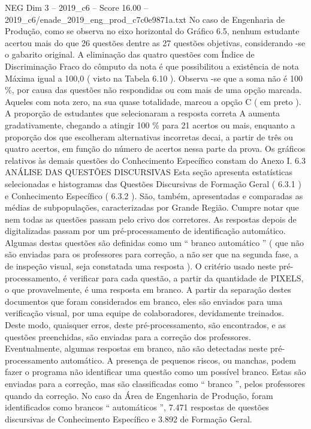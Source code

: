 \begin{textsample}{NEG Dim 3 – 2019\_c6 – Score 16.00 – 2019\_c6/enade\_2019\_eng\_prod\_c7c0e9871a.txt}
No caso de Engenharia de Produção, como se observa no eixo horizontal do Gráfico 6.5, nenhum estudante acertou mais do que 26 questões dentre as 27 questões objetivas, considerando -se o gabarito original.
A eliminação das quatro questões com Índice de Discriminação Fraco do cômputo da nota é que possibilitou a existência de nota Máxima igual a 100,0 ( visto na Tabela 6.10 ).
Observa -se que a soma não é 100 \%, por causa das questões não respondidas ou com mais de uma opção marcada.
Aqueles com nota zero, na sua quase totalidade, marcou a opção C ( em preto ).
A proporção de estudantes que selecionaram a resposta correta A aumenta gradativamente, chegando a atingir 100 \% para 21 acertos ou mais, enquanto a proporção dos que escolheram alternativas incorretas decai, a partir de três ou quatro acertos, em função do número de acertos nessa parte da prova.
Os gráficos relativos às demais questões do Conhecimento Específico constam do Anexo I. 6.3 ANÁLISE DAS QUESTÕES DISCURSIVAS Esta seção apresenta estatísticas selecionadas e histogramas das Questões Discursivas de Formação Geral ( 6.3.1 ) e Conhecimento Específico ( 6.3.2 ).
São, também, apresentadas e comparadas as médias de subpopulações, caracterizadas por Grande Região.
Cumpre notar que nem todas as questões passam pelo crivo dos corretores.
As respostas depois de digitalizadas passam por um pré-processamento de identificação automático.
Algumas destas questões são definidas como um “ branco automático ” ( que não são enviadas para os professores para correção, a não ser que na segunda fase, a de inspeção visual, seja constatada uma resposta ).
O critério usado neste pré-processamento, é verificar para cada questão, a partir da quantidade de PIXELS, o que provavelmente, é uma resposta em branco.
A partir da separação destes documentos que foram considerados em branco, eles são enviados para uma verificação visual, por uma equipe de colaboradores, devidamente treinados.
Deste modo, quaisquer erros, deste pré-processamento, são encontrados, e as questões preenchidas, são enviadas para a correção dos professores.
Eventualmente, algumas respostas em branco, não são detectadas neste pré-processamento automático.
A presença de pequenos riscos, ou manchas, podem fazer o programa não identificar uma questão como um possível branco.
Estas são enviadas para a correção, mas são classificadas como “ branco ”, pelos professores quando da correção.
No caso da Área de Engenharia de Produção, foram identificados como brancos “ automáticos ”, 7.471 respostas de questões discursivas de Conhecimento Específico e 3.892 de Formação Geral.

\end{textsample}
